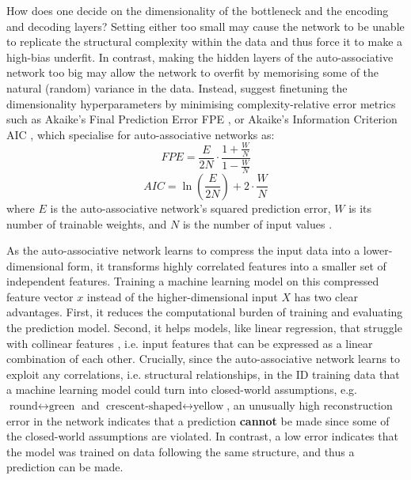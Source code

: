 \newpar How does one decide on the dimensionality of the bottleneck and the encoding and decoding layers? Setting either too small may cause the network to be unable to replicate the structural complexity within the data and thus force it to make a high-bias underfit. In contrast, making the hidden layers of the auto-associative network too big may allow the network to overfit by memorising some of the natural (random) variance in the data. Instead, \textcite{auto-associative-2001} suggest finetuning the dimensionality hyperparameters by minimising complexity-relative error metrics such as Akaike's Final Prediction Error FPE \cite{akaike-fpe-1969, akaike-fpe-1970, akaike-fpe-1971}, or Akaike's Information Criterion AIC \cite{akaike-aic-1974}, which \citeauthor{auto-associative-2001} specialise for auto-associative networks as:
\begin{equation*}
    FPE = \frac{E}{2N} \cdot \frac{1 + \frac{W}{N}}{1 - \frac{W}{N}}
\end{equation*}
\begin{equation*}
    AIC = \ln{\left(\frac{E}{2N}\right)} + 2 \cdot \frac{W}{N}
\end{equation*}
where $E$ is the auto-associative network's squared prediction error, $W$ is its number of trainable weights, and $N$ is the number of input values \cite{auto-associative-2001}.

\newpar As the auto-associative network learns to compress the input data into a lower-dimensional form, it transforms highly correlated features into a smaller set of independent features. Training a machine learning model on this compressed feature vector $x$ instead of the higher-dimensional input $X$ has two clear advantages. First, it reduces the computational burden of training and evaluating the prediction model. Second, it helps models, like linear regression, that struggle with collinear features \cite{regression-collinearity-1984}, i.e. input features that can be expressed as a linear combination of each other. Crucially, since the auto-associative network learns to exploit any correlations, i.e. structural relationships, in the ID training data that a machine learning model could turn into closed-world assumptions, e.g. $\text{round} \leftrightarrow \text{green}$ and $\text{crescent-shaped} \leftrightarrow \text{yellow}$, an unusually high reconstruction error in the network indicates that a prediction \textbf{cannot} be made since some of the closed-world assumptions are violated. In contrast, a low error indicates that the model was trained on data following the same structure, and thus a prediction can be made.

